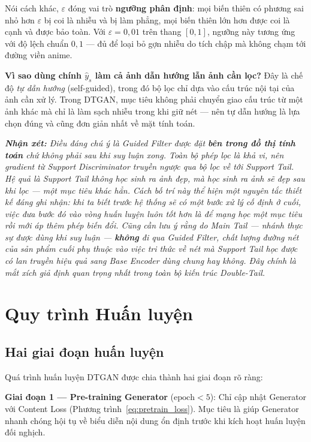 Nói cách khác, $\varepsilon$ đóng vai trò \textbf{ngưỡng phân định}: mọi biến thiên có phương sai nhỏ hơn $\varepsilon$ bị coi là nhiễu và bị làm phẳng, mọi biến thiên lớn hơn được coi là cạnh và được bảo toàn. Với $\varepsilon = 0{,}01$ trên thang $[0,1]$, ngưỡng này tương ứng với độ lệch chuẩn $0{,}1$ --- đủ để loại bỏ gợn nhiễu do tích chập mà không chạm tới đường viền anime.

\textbf{Vì sao dùng chính $\widehat{y}_s$ làm cả ảnh dẫn hướng lẫn ảnh cần lọc?} Đây là chế độ \textit{tự dẫn hướng} (self-guided), trong đó bộ lọc chỉ dựa vào cấu trúc nội tại của ảnh cần xử lý. Trong DTGAN, mục tiêu không phải chuyển giao cấu trúc từ một ảnh khác mà chỉ là làm sạch nhiễu trong khi giữ nét --- nên tự dẫn hướng là lựa chọn đúng và cũng đơn giản nhất về mặt tính toán.

\medskip
\noindent\textit{\textbf{Nhận xét:} Điều đáng chú ý là Guided Filter được đặt \textbf{bên trong đồ thị tính toán} chứ không phải sau khi suy luận xong. Toàn bộ phép lọc là khả vi, nên gradient từ Support Discriminator truyền ngược \textit{qua} bộ lọc về tới Support Tail. Hệ quả là Support Tail không học sinh ra ảnh đẹp, mà học sinh ra ảnh \textit{sẽ đẹp sau khi lọc} --- một mục tiêu khác hẳn. Cách bố trí này thể hiện một nguyên tắc thiết kế đáng ghi nhận: khi ta biết trước hệ thống sẽ có một bước xử lý cố định ở cuối, việc đưa bước đó vào vòng huấn luyện luôn tốt hơn là để mạng học một mục tiêu rồi mới áp thêm phép biến đổi. Cũng cần lưu ý rằng do Main Tail --- nhánh thực sự được dùng khi suy luận --- \textbf{không} đi qua Guided Filter, chất lượng đường nét của sản phẩm cuối phụ thuộc vào việc tri thức về nét mà Support Tail học được có lan truyền hiệu quả sang Base Encoder dùng chung hay không. Đây chính là mắt xích giả định quan trọng nhất trong toàn bộ kiến trúc Double-Tail.}

\section{Quy trình Huấn luyện}
\label{sec:training}

\subsection{Hai giai đoạn huấn luyện}
\label{subsec:training_stages}

Quá trình huấn luyện DTGAN được chia thành hai giai đoạn rõ ràng:

\textbf{Giai đoạn 1 --- Pre-training Generator} ($\text{epoch} < 5$): Chỉ cập nhật Generator với Content Loss (Phương trình~\ref{eq:pretrain_loss}). Mục tiêu là giúp Generator nhanh chóng hội tụ về biểu diễn nội dung ổn định trước khi kích hoạt huấn luyện đối nghịch.

